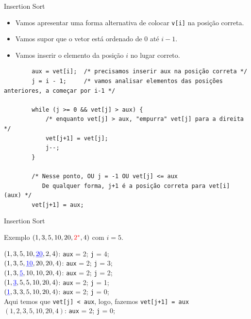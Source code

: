 \documentclass[handout]{beamer}
\newcommand{\cod}[1]{\texttt{#1}}
\begin{document}
\begin{frame}[fragile]{Insertion Sort}

    \begin{itemize}
        \item Vamos apresentar uma forma alternativa de colocar \cod{v[i]} na posição correta.
        \item Vamos supor que o vetor está ordenado de $0$ até $i-1$.
        \item Vamos inserir o elemento da posição $i$ no lugar correto.
    \end{itemize}
    \vspace{-1em}
    \begin{verbatim}
        aux = vet[i];  /* precisamos inserir aux na posição correta */
        j = i - 1;     /* vamos analisar elementos das posições anteriores, a começar por i-1 */
        
        while (j >= 0 && vet[j] > aux) {
            /* enquanto vet[j] > aux, "empurra" vet[j] para a direita */
            vet[j+1] = vet[j];
            j--;
        }

        /* Nesse ponto, OU j = -1 OU vet[j] <= aux
           De qualquer forma, j+1 é a posição correta para vet[i] (aux) */
        vet[j+1] = aux;
    \end{verbatim} 

\end{frame}

\begin{frame}[fragile]{Insertion Sort}

    Exemplo $(1, 3, 5, 10, 20, {\color{red}2^*}, 4)$ com $i=5$.

    $(1, 3, 5, 10, {\color{blue}\underline{20}}, 2, 4)$: \cod{aux} = 2; \cod{j} = 4; \\
    $(1, 3, 5, {\color{blue}\underline{10}}, 20, 20, 4)$: \cod{aux} = 2; \cod{j} = 3; \\
    $(1, 3, {\color{blue}\underline{5}}, 10, 10, 20, 4)$: \cod{aux} = 2; \cod{j} = 2; \\
    $(1, {\color{blue}\underline{3}}, 5, 5, 10, 20, 4)$: \cod{aux} = 2; \cod{j} = 1; \\
    $({\color{blue}\underline{1}}, 3, 3, 5, 10, 20, 4)$: \cod{aux} = 2; \cod{j} = 0; \\
    Aqui temos que \cod{vet[j] < aux}, logo, fazemos \cod{vet[j+1] = aux}\\
    $(1, 2, 3, 5, 10, 20, 4)$: \cod{aux} = 2; \cod{j} = 0; \\

\end{frame}
\end{document}
